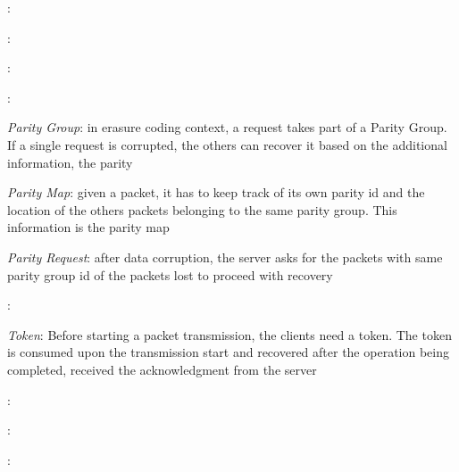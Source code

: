 \textit{}:
\vspace{10pt}

\textit{}:
\vspace{10pt}

\textit{}:
\vspace{10pt}

\textit{}:
\vspace{10pt}

\textit{Parity Group}: in erasure coding context, a request takes part of a
Parity Group. If a single request is corrupted, the others can recover it based
on the additional information, the parity
\vspace{10pt}

\textit{Parity Map}: given a packet, it has to keep track of its own parity id
and the location of the others packets belonging to the same parity group. This
information is the parity map
\vspace{10pt}

\textit{Parity Request}: after data corruption, the server asks for the packets
with same parity group id of the packets lost to proceed with recovery
\vspace{10pt}

\textit{}:
\vspace{10pt}

\textit{Token}: Before starting a packet transmission, the clients need a token.
The token is consumed upon the transmission start and recovered after the
operation being completed, received the acknowledgment from the server
\vspace{10pt} 

\textit{}:
\vspace{10pt}

\textit{}:
\vspace{10pt}

\textit{}:
\vspace{10pt}


